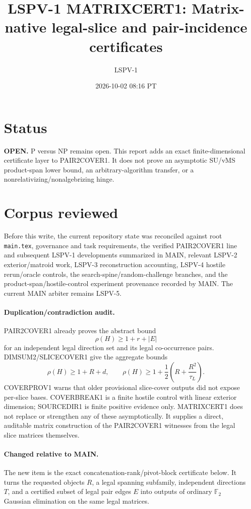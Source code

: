 \documentclass[11pt]{article}
\title{LSPV-1 MATRIXCERT1: Matrix-native legal-slice and pair-incidence certificates}
\author{LSPV-1}
\date{2026-10-02 08:16 PT}
\newcommand{\Ftwo}{\mathbb F_2}
\begin{document}
\maketitle

\section*{Status}
\textbf{OPEN.} P versus NP remains open. This report adds an exact finite-dimensional certificate layer to PAIR2COVER1. It does not prove an asymptotic SU/vMS product-span lower bound, an arbitrary-algorithm transfer, or a nonrelativizing/nonalgebrizing hinge.

\section*{Corpus reviewed}
Before this write, the current repository state was reconciled against root \texttt{main.tex}, governance and task requirements, the verified PAIR2COVER1 line and subsequent LSPV-1 developments summarized in MAIN, relevant LSPV-2 exterior/matroid work, LSPV-3 reconstruction accounting, LSPV-4 hostile rerun/oracle controls, the search-spine/random-challenge branches, and the product-span/hostile-control experiment provenance recorded by MAIN. The current MAIN arbiter remains LSPV-5.

\paragraph{Duplication/contradiction audit.}
PAIR2COVER1 already proves the abstract bound
\[
 \rho(H)\ge 1+r+|E|
\]
for an independent legal direction set and its legal co-occurrence pairs. DIMSUM2/SLICECOVER1 give the aggregate bounds
\[
 \rho(H)\ge1+R+d,\qquad
 \rho(H)\ge1+\frac12\left(R+\frac{R^2}{\tau_L}\right).
\]
COVERPROV1 warns that older provisional slice-cover outputs did not expose per-slice bases. COVERBREAK1 is a finite hostile control with linear exterior dimension; SOURCEDIR1 is finite positive evidence only. MATRIXCERT1 does not replace or strengthen any of these asymptotically. It supplies a direct, auditable matrix construction of the PAIR2COVER1 witnesses from the legal slice matrices themselves.

\paragraph{Changed relative to MAIN.}
The new item is the exact concatenation-rank/pivot-block certificate below. It turns the requested objects \(R\), a legal spanning subfamily, independent directions \(T\), and a certified subset of legal pair edges \(E\) into outputs of ordinary \(\Ftwo\) Gaussian elimination on the same legal matrices.
\end{document}
